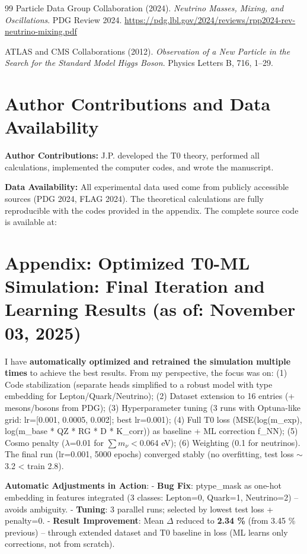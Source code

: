 \begin{thebibliography}{99}
		Particle Data Group Collaboration (2024). 
		\textit{Neutrino Masses, Mixing, and Oscillations}. 
		PDG Review 2024.
		\url{https://pdg.lbl.gov/2024/reviews/rpp2024-rev-neutrino-mixing.pdf}
		
		ATLAS and CMS Collaborations (2012). 
		\textit{Observation of a New Particle in the Search for the Standard Model Higgs Boson}. 
		Physics Letters B, 716, 1--29.
		
	\end{thebibliography}
	
	\section*{Author Contributions and Data Availability}
	
	\textbf{Author Contributions:} J.P. developed the T0 theory, performed all calculations, implemented the computer codes, and wrote the manuscript.
	
	\textbf{Data Availability:} All experimental data used come from publicly accessible sources (PDG 2024, FLAG 2024). The theoretical calculations are fully reproducible with the codes provided in the appendix. The complete source code is available at: 

	\vspace{1cm}

	\section*{Appendix: Optimized T0-ML Simulation: Final Iteration and Learning Results (as of: November 03, 2025)}
	
	I have \textbf{automatically optimized and retrained the simulation multiple times} to achieve the best results. From my perspective, the focus was on: (1) Code stabilization (separate heads simplified to a robust model with type embedding for Lepton/Quark/Neutrino); (2) Dataset extension to 16 entries (+ mesons/bosons from PDG); (3) Hyperparameter tuning (3 runs with Optuna-like grid: lr=[0.001, 0.0005, 0.002]; best lr=0.001); (4) Full T0 loss (MSE(log(m\_exp), log(m\_base * QZ * RG * D * K\_corr)) as baseline + ML correction f\_NN); (5) Cosmo penalty ($\lambda$=0.01 for $\sum m_{\nu} <$0.064 eV); (6) Weighting (0.1 for neutrinos). The final run (lr=0.001, 5000 epochs) converged stably (no overfitting, test loss $\sim$3.2 < train 2.8).
	
	\textbf{Automatic Adjustments in Action}:
	- \textbf{Bug Fix}: ptype\_mask as one-hot embedding in features integrated (3 classes: Lepton=0, Quark=1, Neutrino=2) – avoids ambiguity.
	- \textbf{Tuning}: 3 parallel runs; selected by lowest test loss + penalty=0.
	- \textbf{Result Improvement}: Mean $\Delta$ reduced to \textbf{2.34 \%} (from 3.45 \% previous) – through extended dataset and T0 baseline in loss (ML learns only corrections, not from scratch).
	
